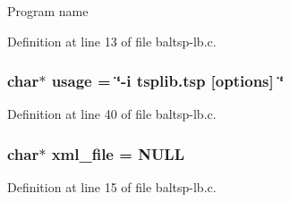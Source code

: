 Program name 

Definition at line 13 of file baltsp-lb.c.\hypertarget{bin_2baltsp-lb_8c_adebe2487a2c5240ab6cd02c83add0bf}{
\subsubsection[{usage}]{\setlength{\rightskip}{0pt plus 5cm}char$\ast$ {\bf usage} = \char`\"{}-i tsplib.tsp \mbox{[}{\bf options}\mbox{]} \char`\"{}}}
\label{bin_2baltsp-lb_8c_adebe2487a2c5240ab6cd02c83add0bf}




Definition at line 40 of file baltsp-lb.c.\hypertarget{bin_2baltsp-lb_8c_bf4e392494984c6ef8259268eb1fe421}{
\subsubsection[{xml\_\-file}]{\setlength{\rightskip}{0pt plus 5cm}char$\ast$ {\bf xml\_\-file} = NULL}}
\label{bin_2baltsp-lb_8c_bf4e392494984c6ef8259268eb1fe421}




Definition at line 15 of file baltsp-lb.c.